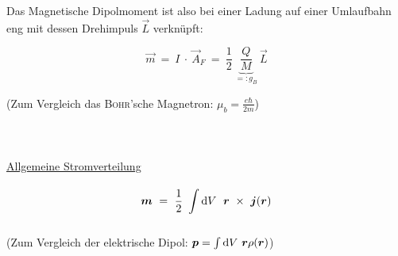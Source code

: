 Das Magnetische Dipolmoment ist also bei einer Ladung auf einer Umlaufbahn eng mit dessen Drehimpuls $\vec{L}$ verknüpft:

\begin{equation*}
\vec{m}  \ =\ I \ \cdot \ \vec{A}_F \ = \ \frac{1}{2} \ \underbrace{\frac{Q}{M}}_{=: g_B} \ \vec{L}
\end{equation*}

(Zum Vergleich das \textsc{Bohr}'sche Magnetron: $\mu_b = \frac{e\hbar}{2m}$)
\ \\
\ \\
\ \\
\ \\
\underline{Allgemeine Stromverteilung}


\begin{equation*}
\bm{m} \ = \ \frac{1}{2} \ \int\limits_{{}}^{{}}\mathrm{d}{V}\  \; \bm{r}\ \times \ \bm{j}(\bm{r})
\end{equation*}

(Zum Vergleich der elektrische Dipol: $\bm{p} = \int\limits_{{}}^{{}}\mathrm{d}{V}\  \bm{r}\rho(\bm{r})$)
